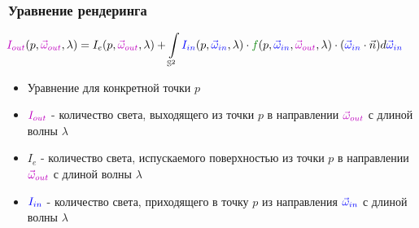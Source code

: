 \documentclass{beamer}
\begin{document}
\begin{frame}[fragile]
\frametitle{Уравнение рендеринга}
\begin{equation}
\hspace*{-0.5cm}
{\color{magenta}I_{out}}(p, {\color{magenta}\vec\omega_{out}}, \lambda) = I_{e}(p, {\color{magenta}\vec\omega_{out}}, \lambda)+\int\limits_{\mathbb S^2} {\color{blue}I_{in}}(p, {\color{blue}\vec\omega_{in}}, \lambda) \cdot {\color{green}f}(p, {\color{blue}\vec\omega_{in}}, {\color{magenta}\vec\omega_{out}}, \lambda) \cdot ({\color{blue}\vec\omega_{in}} \cdot \vec{n}) d{\color{blue}\vec\omega_{in}}
\end{equation}
\pause
\begin{itemize}
\item Уравнение для конкретной точки \begin{math}p\end{math}
\pause
\item \begin{math}{\color{magenta}I_{out}}\end{math} - количество света, выходящего из точки \begin{math}p\end{math} в направлении \begin{math}{\color{magenta}\vec\omega_{out}}\end{math} с длиной волны \begin{math}\lambda\end{math}
\pause
\item \begin{math}I_{e}\end{math} - количество света, испускаемого поверхностью из точки \begin{math}p\end{math} в направлении \begin{math}{\color{magenta}\vec\omega_{out}}\end{math} с длиной волны \begin{math}\lambda\end{math}
\pause
\item \begin{math}{\color{blue}I_{in}}\end{math} - количество света, приходящего в точку \begin{math}p\end{math} из направления \begin{math}{\color{blue}\vec\omega_{in}}\end{math} с длиной волны \begin{math}\lambda\end{math}

\end{itemize}
\end{frame}
\end{document}
